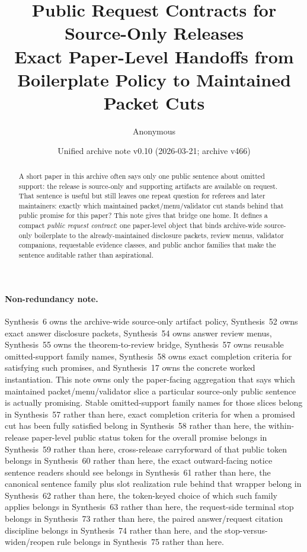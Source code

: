 \documentclass[11pt]{article}
\title{Public Request Contracts for Source-Only Releases\\\large Exact Paper-Level Handoffs from Boilerplate Policy to Maintained Packet Cuts}
\author{Anonymous}
\date{Unified archive note v0.10 (2026-03-21; archive v466)}
\begin{document}
\maketitle

\begin{abstract}
A short paper in this archive often says only one public sentence about omitted support: the release is source-only and supporting artifacts are available on request. That sentence is useful but still leaves one repeat question for referees and later maintainers: exactly which maintained packet/menu/validator cut stands behind that public promise for this paper? This note gives that bridge one home. It defines a compact \emph{public request contract}: one paper-level object that binds archive-wide source-only boilerplate to the already-maintained disclosure packets, review menus, validator companions, requestable evidence classes, and public anchor families that make the sentence auditable rather than aspirational.
\end{abstract}

\paragraph{Non-redundancy note.}
Synthesis~6 owns the archive-wide source-only artifact policy, Synthesis~52 owns exact answer disclosure packets, Synthesis~54 owns answer review menus, Synthesis~55 owns the theorem-to-review bridge, Synthesis~57 owns reusable omitted-support family names, Synthesis~58 owns exact completion criteria for satisfying such promises, and Synthesis~17 owns the concrete worked instantiation.\cite{series:artifactpolicy,series:challengeanswerdisclosurepackets,series:challengeanswerreviewmenus,series:seriesspines,series:requestableevidenceclasses,series:requestfulfillmentcertificates,series:workedexample}
This note owns only the paper-facing aggregation that says which maintained packet/menu/validator slice a particular source-only public sentence is actually promising. Stable omitted-support family names for those slices belong in Synthesis~57 rather than here, exact completion criteria for when a promised cut has been fully satisfied belong in Synthesis~58 rather than here, the within-release paper-level public status token for the overall promise belongs in Synthesis~59 rather than here, cross-release carryforward of that public token belongs in Synthesis~60 rather than here, the exact outward-facing notice sentence readers should see belongs in Synthesis~61 rather than here, the canonical sentence family plus slot realization rule behind that wrapper belong in Synthesis~62 rather than here, the token-keyed choice of which such family applies belongs in Synthesis~63 rather than here, the request-side terminal stop belongs in Synthesis~73 rather than here, the paired answer/request citation discipline belongs in Synthesis~74 rather than here, and the stop-versus-widen/reopen rule belongs in Synthesis~75 rather than here.
\end{document}
